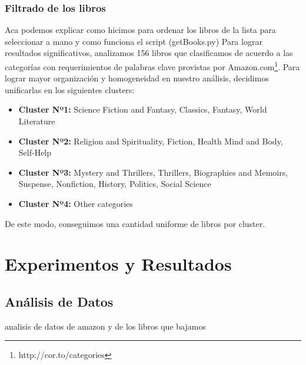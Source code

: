 \documentclass[12pt,journal,compsoc]{IEEEtran}
\begin{document}
\subsubsection{Filtrado de los libros} Aca podemos explicar como hicimos para ordenar los libros de la lista para seleccionar a mano y como funciona el script (getBooks.py)
Para lograr resultados significativos, analizamos 156 libros que clasificamos de acuerdo a las categorías con requerimientos de palabras clave provistas por Amazon.com\footnote{http://cor.to/categories}. Para lograr mayor organización y homogeneidad en nuestro análisis, decidimos unificarlas en los siguientes clusters:
\begin{itemize}
\item \textbf{Cluster Nº1:} Science Fiction and Fantasy, Classics, Fantasy, World Literature
\item \textbf{Cluster Nº2:} Religion and Spirituality, Fiction, Health Mind and Body, Self-Help
\item \textbf{Cluster Nº3:} Mystery and Thrillers, Thrillers, Biographies and Memoirs, Suspense, Nonfiction, History, Politics, Social Science
\item \textbf{Cluster Nº4:} Other categories
\end{itemize}
De este modo, conseguimos una cantidad uniforme de libros por cluster.

\section{Experimentos y Resultados}
\subsection{Análisis de Datos} 
analisis de datos de amazon y de los libros que bajamos
\end{document}
